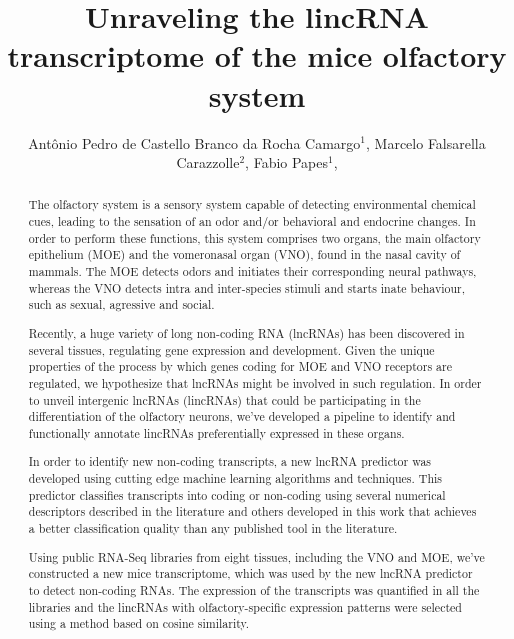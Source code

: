 \documentclass[twoside]{article}
\title{\vspace{-15mm}\fontsize{24pt}{10pt}\selectfont\textbf{ Unraveling the lincRNA transcriptome of the mice olfactory system }} %
\author{ Antônio Pedro de Castello Branco da Rocha Camargo$^{1}$, Marcelo Falsarella Carazzolle$^{2}$, Fabio Papes$^{1}$, }
\affil{ 1 UNICAMP

2 Biology Institute - UNICAMP, National Center for High Performance Computing

 }
\date{}
\begin{document}
  
  
  \maketitle %
  
  
  \thispagestyle{fancy} %
  
  
  \begin{abstract}
  The olfactory system is a sensory system capable of detecting environmental chemical cues, leading to the sensation of an odor and/or behavioral and endocrine changes. In order to perform these functions, this system comprises two organs, the main olfactory epithelium (MOE) and the vomeronasal organ (VNO), found in the nasal cavity of mammals. The MOE detects odors and initiates their corresponding neural pathways, whereas the VNO detects intra and inter-species stimuli and starts inate behaviour, such as sexual, agressive and social.

Recently, a huge variety of long non-coding RNA (lncRNAs) has been discovered in several tissues, regulating gene expression and development. Given the unique properties of the process by which genes coding for MOE and VNO receptors are regulated, we hypothesize that lncRNAs might be involved in such regulation. In order to unveil intergenic lncRNAs (lincRNAs) that could be participating in the differentiation of the olfactory neurons, we’ve developed a pipeline to identify and functionally annotate lincRNAs preferentially expressed in these organs.

In order to identify new non-coding transcripts, a new lncRNA predictor was developed using cutting edge machine learning algorithms and techniques. This predictor classifies transcripts into coding or non-coding using several numerical descriptors described in the literature and others developed in this work that achieves a better classification quality than any published tool in the literature.

Using public RNA-Seq libraries from eight tissues, including the VNO and MOE, we’ve constructed a new mice transcriptome, which was used by the new lncRNA predictor to detect non-coding RNAs. The expression of the transcripts was quantified in all the libraries and the lincRNAs with olfactory-specific expression patterns were selected using a method based on cosine similarity.


\end{abstract}
\end{document}
